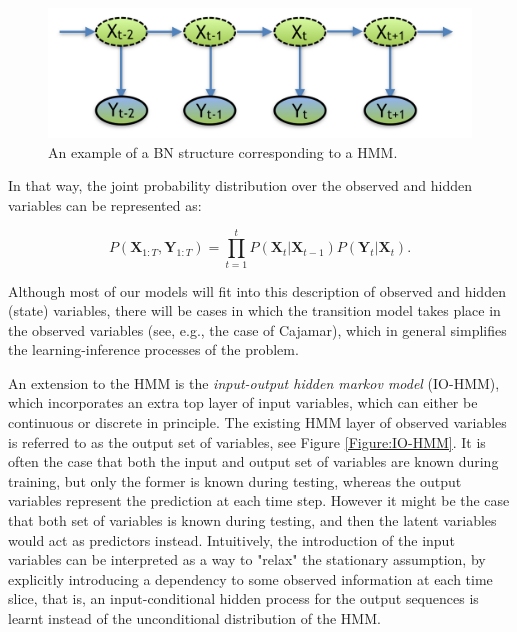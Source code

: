 \begin{figure}[ht!]
\begin{center}
\includegraphics[scale=0.4]{./figures/PreliminariesHMM}
\caption{\label{Figure:HMM}An example of a BN structure corresponding to a HMM.}
\end{center}
\end{figure}

In that way, the joint probability distribution over the observed and hidden variables can be represented as:

\begin{equation}
P(\bm X_{1:T},\bm Y_{1:T}) = \prod_{t=1}^t{P(\bm X_t| \bm X_{t-1})P(\bm Y_t|\bm X_t)}.
\end{equation}

Although most of our models will fit into this description of observed and hidden (state) variables, there will be cases in which the transition model takes place in the observed variables (see, e.g., the case of Cajamar), which in general simplifies the learning-inference processes of the problem.

An extension to the HMM is the \textit{input-output hidden markov model} (IO-HMM), which incorporates an extra top layer of input variables, which can either be continuous or discrete in principle. The existing HMM layer of observed variables is referred to as the output set of variables, see Figure \ref{Figure:IO-HMM}. It is often the case that both the input and output set of variables are known during training, but only the former is known during testing, whereas the output variables represent the prediction at each time step. However it might be the case that both set of variables is known during testing, and then the latent variables would act as predictors instead. Intuitively, the introduction of the input variables can be interpreted as a way to "relax" the stationary assumption, by explicitly introducing a dependency to some observed information at each time slice, that is, an input-conditional hidden process for the output sequences is learnt instead of the unconditional distribution of the HMM.

